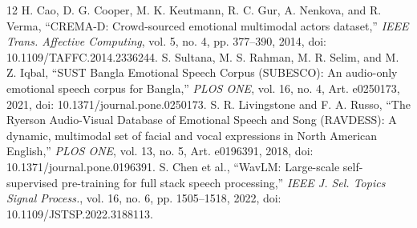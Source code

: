\documentclass[letterpaper]{article}
\begin{document}
\begin{thebibliography}{12}
 H. Cao, D. G. Cooper, M. K. Keutmann, R. C. Gur, A. Nenkova, and R. Verma, ``CREMA-D: Crowd-sourced emotional multimodal actors dataset,'' \emph{IEEE Trans. Affective Computing}, vol. 5, no. 4, pp. 377--390, 2014, doi: 10.1109/TAFFC.2014.2336244.
 S. Sultana, M. S. Rahman, M. R. Selim, and M. Z. Iqbal, ``SUST Bangla Emotional Speech Corpus (SUBESCO): An audio-only emotional speech corpus for Bangla,'' \emph{PLOS ONE}, vol. 16, no. 4, Art. e0250173, 2021, doi: 10.1371/journal.pone.0250173.
 S. R. Livingstone and F. A. Russo, ``The Ryerson Audio-Visual Database of Emotional Speech and Song (RAVDESS): A dynamic, multimodal set of facial and vocal expressions in North American English,'' \emph{PLOS ONE}, vol. 13, no. 5, Art. e0196391, 2018, doi: 10.1371/journal.pone.0196391.
 S. Chen et al., ``WavLM: Large-scale self-supervised pre-training for full stack speech processing,'' \emph{IEEE J. Sel. Topics Signal Process.}, vol. 16, no. 6, pp. 1505--1518, 2022, doi: 10.1109/JSTSP.2022.3188113.
\end{thebibliography}
\end{document}
